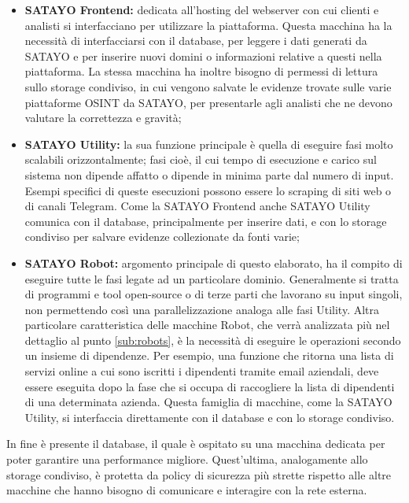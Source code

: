 \begin{itemize}
  \item \textbf{SATAYO Frontend:} dedicata all'hosting del webserver con cui
    clienti e analisti si interfacciano per utilizzare la piattaforma. Questa macchina
    ha la necessità di interfacciarsi con il database, per leggere i dati
    generati da SATAYO e per inserire nuovi domini o informazioni relative a
    questi nella piattaforma. La stessa macchina ha inoltre bisogno di permessi di
    lettura sullo storage condiviso, in cui vengono salvate le evidenze trovate
    sulle varie piattaforme OSINT da SATAYO, per presentarle agli analisti che ne
    devono valutare la correttezza e gravità;

  \item \textbf{SATAYO Utility:} la sua funzione principale è quella di eseguire
    fasi molto scalabili orizzontalmente; fasi cioè, il cui tempo di esecuzione
    e carico sul sistema non dipende affatto o dipende in minima parte dal
    numero di input. Esempi specifici di queste esecuzioni possono essere lo scraping
    di siti web o di canali Telegram. Come la SATAYO Frontend anche SATAYO
    Utility comunica con il database, principalmente per inserire dati, e con lo
    storage condiviso per salvare evidenze collezionate da fonti varie;

  \item \textbf{SATAYO Robot:} argomento principale di questo elaborato, ha il compito
    di eseguire tutte le fasi legate ad un particolare dominio. Generalmente si
    tratta di programmi e tool open-source o di terze parti che lavorano su
    input singoli, non permettendo così una parallelizzazione analoga alle fasi Utility.
    Altra particolare caratteristica delle macchine Robot, che verrà analizzata più
    nel dettaglio al punto \ref{sub:robots}, è la necessità di eseguire le
    operazioni secondo un insieme di dipendenze. Per esempio, una funzione che
    ritorna una lista di servizi online a cui sono iscritti i dipendenti tramite
    email aziendali, deve essere eseguita dopo la fase che si occupa di raccogliere
    la lista di dipendenti di una determinata azienda. Questa famiglia di
    macchine, come la SATAYO Utility, si interfaccia direttamente con il
    database e con lo storage condiviso.
\end{itemize}

In fine è presente il database, il quale è ospitato su una macchina dedicata per
poter garantire una performance migliore. Quest'ultima, analogamente allo storage
condiviso, è protetta da policy di sicurezza più strette rispetto alle altre
macchine che hanno bisogno di comunicare e interagire con la rete esterna.

